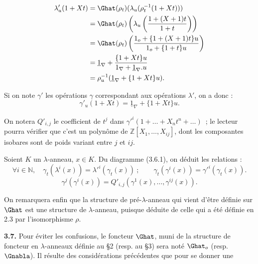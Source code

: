 \[
\begin{aligned}
\lambda'_u(1+Xt) &=\Ghat(\rho_t)(\lambda_u(\rho_t^{-1}(1+Xt)))\\
&=\Ghat(\rho_t)\left(\lambda_u\left(\frac{1+(X+1)t}{1+t}\right)\right)\\
&=\Ghat(\rho_t)\left(\frac{1_o+\{1+(X+1)t\}u}{1_o+\{1+t\}u}\right)\\
&=\underline{1}_\nabla+\frac{\{1+Xt\}u}{1_\nabla+\underline{1}_\nabla.u}\\
&=\rho_u^{-1}(\underline{1}_\nabla+\{1+Xt\}u).
\end{aligned}
\]

Si on note \(\gamma'\) les opérations \(\gamma\) correspondant aux opérations \(\lambda'\), on a donc :
\begin{equation}\tag{3.6.2}
  \gamma'_u(1+Xt)=\underline{1}_\nabla+\{1+Xt\}u .
\end{equation}

On notera \(Q'_{i,j}\) le coefficient de \(t^j\) dans \(\gamma'^i(1+\ldots+X_nt^n+\ldots)\)~; le lecteur pourra vérifier que c'est un polynôme de \(\mathbb Z[X_1,\ldots,X_{ij}]\), dont les composantes isobares sont de poids variant entre \(j\) et \(ij\).

Soient \(K\) un \(\lambda\)-anneau, \(x\in K\). Du diagramme (3.6.1), on déduit les relations :
\begin{equation}\tag{3.6.3}
  \forall i\in\mathbb N,\quad\gamma_t(\lambda^i(x))=\lambda'^i(\gamma_t(x))~;
  \qquad
  \gamma_t(\gamma^i(x))=\gamma'^i(\gamma_t(x)).
\end{equation}
\begin{equation}\tag{3.6.4}
  \gamma^j(\gamma^i(x))
  =Q'_{i,j}(\gamma^1(x),\ldots,\gamma^{ij}(x)).
\end{equation}

On remarquera enfin que la structure de pré-\(\lambda\)-anneau qui vient d'être définie sur \(\Ghat\) est une structure de \(\lambda\)-anneau, puisque déduite de celle qui a été définie en 2.3 par l'isomorphisme \(\rho\).

\textbf{3.7.} Pour éviter les confusions, le foncteur \(\Ghat\), muni de la structure de foncteur en \(\lambda\)-anneaux définie au §2 (resp. au §3) sera noté \(\Ghat_o\) (resp. \(\Gnabla\)). Il résulte des considérations précédentes que pour se donner une
